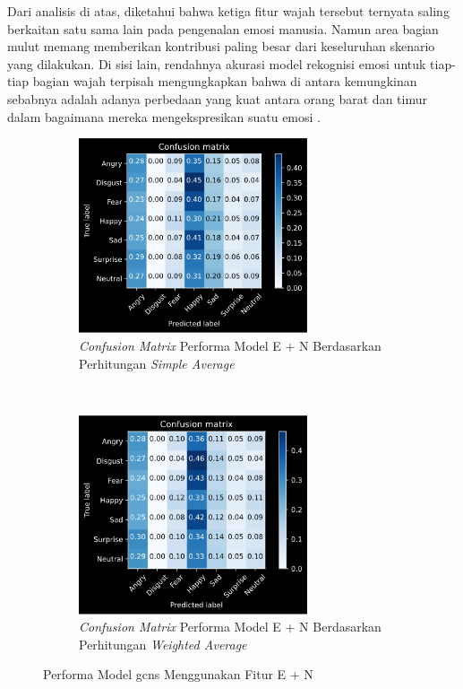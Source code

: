 Dari analisis di atas, diketahui bahwa ketiga fitur wajah tersebut ternyata saling berkaitan satu sama lain pada pengenalan emosi manusia. Namun area bagian mulut memang memberikan kontribusi paling besar dari keseluruhan skenario yang dilakukan. Di sisi lain, rendahnya akurasi model rekognisi emosi untuk tiap-tiap bagian wajah terpisah mengungkapkan bahwa di antara kemungkinan sebabnya adalah adanya perbedaan yang kuat antara orang barat dan timur dalam bagaimana mereka mengekspresikan suatu emosi .

\begin{figure}[t]
    \centering
    \begin{subfigure}[t]{6.75cm}
        \includegraphics[width=6.75cm]{gambar/eksperimen4b3_matriks1.png}
        \caption{\textit{Confusion Matrix} Performa Model E + N Berdasarkan Perhitungan \textit{Simple Average}}
        \label{fig:confusionmatrixeksperimen4b3}
    \end{subfigure}
    ~~~
    \begin{subfigure}[t]{6.75cm}
        \includegraphics[width=6.75cm]{gambar/eksperimen4b3_matriks2.png}
        \caption{\textit{Confusion Matrix} Performa Model E + N Berdasarkan Perhitungan \textit{Weighted Average}}
        \label{fig:confusionmatrixeksperimen4b3}
    \end{subfigure}
    \caption{Performa Model \acrshort{gcns} Menggunakan Fitur E + N}
    \label{fig:hasileksperimen4b3}
\end{figure}

